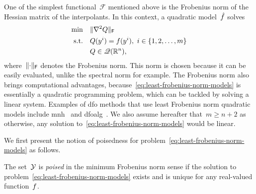 One of the simplest functional~$\mathcal{F}$ mentioned above is the Frobenius norm of the Hessian matrix of the interpolants.
In this context, a quadratic model~$\objm$ solves
\begin{subequations}
    \label{eq:least-frobenius-norm-models}
    \begin{align}
        \min        & \quad \lVert\nabla^2 Q\rVert_{\mathsf{F}}\\
        \text{s.t.} & \quad Q(y^i) = f(y^i), ~ i \in \{1, 2, \dots, m\} \label{eq:least-frobenius-norm-models-eq}\\
                    & \quad Q \in \mathscr{Q}(\mathbb{R}^n), \nonumber
    \end{align}
\end{subequations}
where~$\lVert\cdot\rVert_{\mathsf{F}}$ denotes the Frobenius norm.
This norm is chosen because it can be easily evaluated, unlike the spectral norm for example.
The Frobenius norm also brings computational advantages, because~\cref{eq:least-frobenius-norm-models} is essentially a quadratic programming problem, which can be tackled by solving a linear system.
Examples of \gls{dfo} methods that use least Frobenius norm quadratic models include \gls{mnh}~\cite{Wild_2008} and \gls{dfoalg}~\cite{Conn_Scheinberg_Toint_1997a,Conn_Scheinberg_Toint_1997b,Conn_Scheinberg_Toint_1998}.
We also assume hereafter that~$m \ge n + 2$ as otherwise, any solution to~\cref{eq:least-frobenius-norm-models} would be linear.

We first present the notion of poisedness for problem~\cref{eq:least-frobenius-norm-models} as follows.

\begin{definition}[Poisedness]
    \label{def:poisedness}
    The set~$\xpt$ is \emph{poised} in the minimum Frobenius norm sense if the solution to problem~\cref{eq:least-frobenius-norm-models} exists and is unique for any real-valued function~$f$.
\end{definition}

